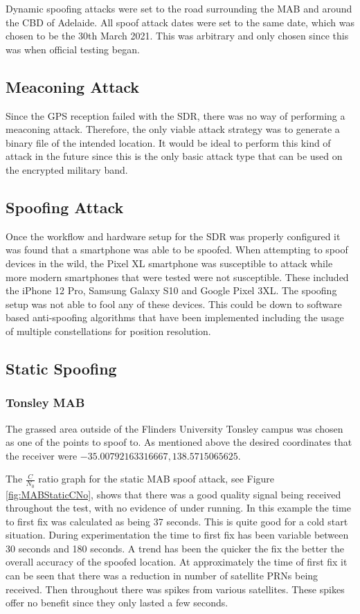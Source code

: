 Dynamic spoofing attacks were set to the road surrounding the MAB and around the CBD of Adelaide. All spoof attack dates were set to the same date, which was chosen to be
the 30th March 2021. This was arbitrary and only chosen since this was when official testing began.

\subsection{Meaconing Attack}
Since the GPS reception failed with the SDR, there was no way of performing a meaconing attack. Therefore, the only viable attack strategy was to generate a binary file
of the intended location. It would be ideal to perform this kind of attack in the future since this is the only basic attack type that can be used on the encrypted
military band.

\subsection{Spoofing Attack}
Once the workflow and hardware setup for the SDR was properly configured it was found that a smartphone was able to be spoofed.
When attempting to spoof devices in the wild, the Pixel XL smartphone was susceptible to attack while more modern smartphones that were tested were not susceptible. These
included the iPhone 12 Pro, Samsung Galaxy S10 and Google Pixel 3XL. The spoofing setup was not able to fool any of these devices. This could be down to software based
anti-spoofing algorithms that have been implemented including the usage of multiple constellations for position resolution.

\subsection{Static Spoofing}
\subsubsection{Tonsley MAB}
The grassed area outside of the Flinders University Tonsley campus was chosen as one of the points to spoof to. As mentioned above the desired coordinates that the receiver were
$-35.00792163316667, 138.5715065625$.

The $\frac{C}{N_0}$ ratio graph for the static MAB spoof attack, see Figure \ref{fig:MABStaticCNo}, shows that there was a good quality signal being received throughout
the test, with no evidence of under running. 
In this example the time to first fix was calculated as being 37 seconds. This is quite good for a cold start situation. During experimentation the time to first fix has
been variable between 30 seconds and 180 seconds. A trend has been the quicker the fix the better the overall accuracy of the spoofed location.
At approximately the time of first fix it can be seen that there was a reduction in number of satellite PRNs being received. Then throughout there was spikes from various
satellites. These spikes offer no benefit since they only lasted a few seconds. 


